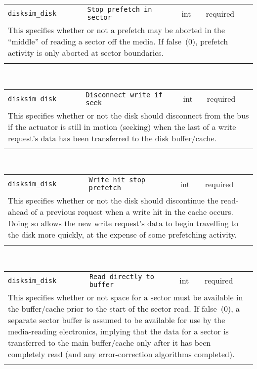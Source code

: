 \noindent 
\begin{tabular}{|p{\lpmodwidth}|p{\lpnamewidth}|p{0.5in}|p{0.5in}|}
\cline{1-4}
\texttt{disksim\_disk} & \texttt{Stop prefetch in sector} & int & required \\ 
\cline{1-4}
\multicolumn{4}{|p{6in}|}{
This specifies whether or not a prefetch may be aborted in the ``middle''
of reading a sector off the media. If false~(0), prefetch activity is
only aborted at sector boundaries.
}\\ 
\cline{1-4}
\multicolumn{4}{p{5in}}{}\\
\end{tabular}\\ 
\noindent 
\begin{tabular}{|p{\lpmodwidth}|p{\lpnamewidth}|p{0.5in}|p{0.5in}|}
\cline{1-4}
\texttt{disksim\_disk} & \texttt{Disconnect write if seek} & int & required \\ 
\cline{1-4}
\multicolumn{4}{|p{6in}|}{
This specifies whether or not the disk should disconnect from the bus if
the actuator is still in motion (seeking) when the last of a write
request's data has been transferred to the disk buffer/cache.
}\\ 
\cline{1-4}
\multicolumn{4}{p{5in}}{}\\
\end{tabular}\\ 
\noindent 
\begin{tabular}{|p{\lpmodwidth}|p{\lpnamewidth}|p{0.5in}|p{0.5in}|}
\cline{1-4}
\texttt{disksim\_disk} & \texttt{Write hit stop prefetch} & int & required \\ 
\cline{1-4}
\multicolumn{4}{|p{6in}|}{
This specifies whether or not
the disk should discontinue the read-ahead of a previous request when a
write hit in the cache occurs. Doing so allows the new write request's
data to begin travelling to the disk more quickly, at the expense of
some prefetching activity.
}\\ 
\cline{1-4}
\multicolumn{4}{p{5in}}{}\\
\end{tabular}\\ 
\noindent 
\begin{tabular}{|p{\lpmodwidth}|p{\lpnamewidth}|p{0.5in}|p{0.5in}|}
\cline{1-4}
\texttt{disksim\_disk} & \texttt{Read directly to buffer} & int & required \\ 
\cline{1-4}
\multicolumn{4}{|p{6in}|}{
This specifies whether or not
space for a sector must be available in the buffer/cache prior to the
start of the sector read. If false~(0), a separate sector buffer is assumed
to be available for use by the media-reading electronics, implying that the
data for a sector is transferred to the main buffer/cache only after it has
been completely read (and any error-correction algorithms completed).
}\\ 
\cline{1-4}
\multicolumn{4}{p{5in}}{}\\
\end{tabular}\\ 
